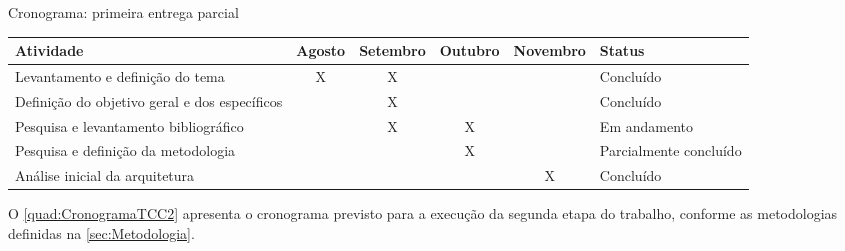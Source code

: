 \begin{quadro}
    \caption{Cronograma: primeira entrega parcial\label{quad:CronogramaTCC1}}
    \begin{tabular}{ | m{4cm} | c | c | c | c | m{2.5cm} | }
    \hline
    \textbf{Atividade} &
        \textbf{Agosto} &
        \textbf{Setembro} &
        \textbf{Outubro} &
        \textbf{Novembro} &
        \textbf{Status} \\ \hline
    Levantamento e definição do tema &
        X &
        X &
        &
        &
        Concluído \\ \hline
    Definição do objetivo geral e dos específicos &
        &
        X &
        &
        &
        Concluído \\ \hline
    Pesquisa e levantamento bibliográfico &
        &
        X &
        X &
        &
        Em andamento \\ \hline
    Pesquisa e definição da metodologia &
        &
        &
        X &
        &
        Parcialmente concluído \\ \hline
    Análise inicial da arquitetura &
        &
        &
        &
        X &
        Concluído \\ \hline
    \end{tabular}
\end{quadro}

O \autoref{quad:CronogramaTCC2} apresenta o cronograma previsto para a execução
da segunda etapa do trabalho, conforme as metodologias definidas na
\autoref{sec:Metodologia}.

